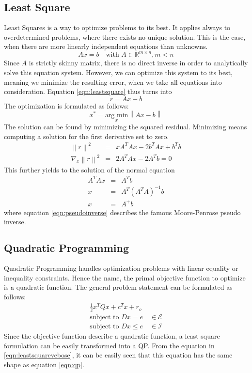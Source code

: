 \subsection{Least Square}
Least Squares is a way to optimize problems to its best. It applies always to overdetermined problems, where there exists no unique solution. This is the case, when there are more linearly independent equations than unknowns. 
\begin{equation}\label{eqn:leastsquare}
Ax = b \quad \text{with } A \in \mathbb{R}^{m \times n}, m < n
\end{equation}
Since $A$ is strictly skinny matrix, there is no direct inverse in order to analytically solve this equation system. However, we can optimize this system to its best, meaning we minimize the resulting error, when we take all equations into consideration. Equation \ref{eqn:leastsquare} thus turns into
\begin{equation}\label{leastsquareerror}
r = Ax -b
\end{equation}
The optimization is formulated as follows:
\begin{equation}
x^* =  \underset{x}{\text{arg min}} \left\| Ax - b \right \|
\end{equation}
The solution can be found by minimizing the squared residual. Minimizing means computing a solution for the first derivative set to zero.
\begin{eqnarray}
\left\| r \right\|^2 &=& xA^TAx - 2b^TAx + b^Tb  \label{eqn:leastsquarevebose}\\
\nabla_x \left\| r \right\|^2 &=& 2 A^TAx - 2A^Tb = 0
\end{eqnarray}
This further yields to the solution of the normal equation
\begin{eqnarray}
A^TAx &=& A^Tb \\
x &=& A^T(A^TA)^{-1} b \\ \label{eqn:pseudoinverse}
x &=& A^+b
\end{eqnarray}
where equation \ref{eqn:pseudoinverse} describes the famous Moore-Penrose pseudo inverse.

\subsection{Quadratic Programming}
Quadratic Programming handles optimization problems with linear equality or inequality constraints. Hence the name, the primal objective function to optimize is a quadratic function. The general problem statement can be formulated as follows:
\begin{eqnarray}\label{eqn:qp}
\frac{1}{2}x^TQx + c^Tx + r_o \\
\text{subject to } Dx = e \quad \in \mathcal{E} \\
\text{subject to } Dx \leq e \quad\in \mathcal{I} 
\end{eqnarray}
Since the objective function describe a quadratic function, a least square formulation can be easily transformed into a QP. 
From the equation in \ref{eqn:leastsquarevebose}, it can be easily seen that this equation has the same shape as equation \ref{eqn:qp}.

